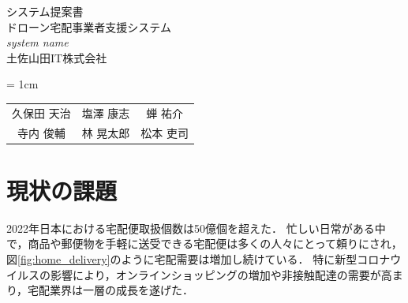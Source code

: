 \documentclass[a4paper, titlepage]{jsarticle}
\date{\today}
\newcommand{\system}{\textsl{system name}}
\begin{document}
\begin{titlepage}
  \centering
  \vspace*{150truept}
  {\Large システム提案書}\\
  \vspace*{50truept}
  {\Huge ドローン宅配事業者支援システム} \\
  \vspace{15truept}
  {\Huge \system} \\
  \vspace{50truept}
  {\LARGE 土佐山田IT株式会社}\\
  \vspace{20truept}
  {\large{\tabcolsep = 1cm
      \begin{tabular}{ccc}
        久保田 天治 & 塩澤 康志 & 蝉 祐介  \\
        寺内 俊輔  & 林 晃太郎 & 松本 吏司
      \end{tabular}
    }}
\end{titlepage}

\tableofcontents

\clearpage

\section{現状の課題}
2022年日本における宅配便取扱個数は50億個を超えた．
忙しい日常がある中で，商品や郵便物を手軽に送受できる宅配便は多くの人々にとって頼りにされ，図\ref{fig:home_delivery}のように宅配需要は増加し続けている．
特に新型コロナウイルスの影響により，オンラインショッピングの増加や非接触配達の需要が高まり，宅配業界は一層の成長を遂げた．
\end{document}
